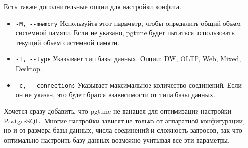 Есть также дополнительные опции для настройки конфига. 
\begin{itemize}
\item 
\lstinline[frame=single]{-M, --memory}
Используйте этот параметр, чтобы определить общий объем системной памяти. 
Если не указано, pgtune будет пытаться использовать текущий объем системной памяти.

\item 
\lstinline[frame=single]{-T, --type}
Указывает тип базы данных. Опции: DW,  OLTP,  Web, Mixed, Desktop.

\item 
\lstinline[frame=single]{-c, --connections}
Указывает максимальное количество соединений. Если он не указан, это будет братся взависимости от типа базы данных.

\end{itemize}

Хочется сразу добавить, что pgtune не панацея для оптимизации настройки PostgreSQL. Многие настройки зависят не только от 
аппаратной конфигурации, но и от размера базы данных, числа соединений и сложность запросов, так что оптимально настроить базу данных 
возможно учитывая все эти параметры.